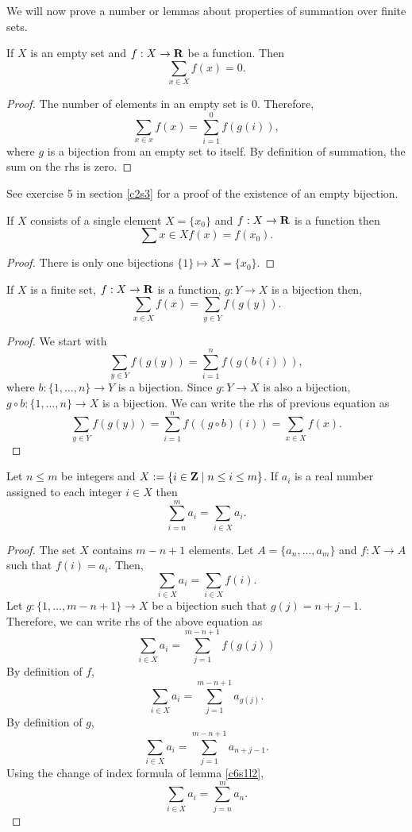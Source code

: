 We will now prove a number or lemmas about properties of summation over
finite sets.
\begin{lem}\label{c6s1l7}
If $X$ is an empty set and $f: X \rightarrow \mathbf{R}$ be a function. Then
\[
\sum_{x \in X}f(x) = 0.
\]
\end{lem}
\begin{proof}
The number of elements in an empty set is $0$. Therefore,
\[
\sum_{x \in x}f(x) = \sum_{i=1}^0f(g(i)),
\]
where $g$ is a bijection from an empty set to itself. By definition of
summation, the sum on the rhs is zero.
\end{proof}
\begin{rem}
See exercise 5 in section \ref{c2s3} for a proof of the existence of an
empty bijection.
\end{rem}

\begin{lem}\label{c6s1l8}
If $X$ consists of a single element $X = \{x_0\}$ and $f:X \rightarrow \mathbf{R}$
is a function then
\[
\sum{x \in X}f(x) = f(x_0).
\]
\end{lem}
\begin{proof}
There is only one bijections $\{1\} \mapsto X = \{x_0\}$.
\end{proof}

\begin{lem}\label{c6s1l9}
If $X$ is a finite set, $f: X \rightarrow \mathbf{R}$ is a function, $g: Y 
\rightarrow X$ is a bijection then,
\[
\sum_{x \in X}f(x) = \sum_{y \in Y}f(g(y)).
\]
\end{lem}
\begin{proof}
We start with
\[
\sum_{y \in Y}f(g(y)) = \sum_{i=1}^n f(g(b(i))),
\]
where $b: \{1, \ldots, n\} \rightarrow Y$ is a bijection. Since $g: Y
\rightarrow X$ is also a bijection, $g \circ b: \{1, \ldots, n\} \rightarrow
X$ is a bijection. We can write the rhs of previous equation as
\[
\sum_{y \in Y}f(g(y)) = \sum_{i=1}^n f((g \circ b)(i)) = \sum_{x \in X}f(x).
\]
\end{proof}

\begin{lem}\label{c6s1l10}
Let $n \le m$ be integers and $X := \{i \in \mathbf{Z} \;|\; n \le i \le m\}$. If
$a_i$ is a real number assigned to each integer $i \in X$ then
\[
\sum_{i=n}^m a_i = \sum_{i \in X}a_i.
\]
\end{lem}
\begin{proof}
The set $X$ contains $m - n + 1$ elements. Let $A = \{a_n, \ldots, a_m\}$
and $f: X \rightarrow A$ such that $f(i) = a_i$. Then,
\[
\sum_{i \in X}a_i = \sum_{i \in X}f(i).
\]
Let $g:\{1, \ldots, m - n + 1\} \rightarrow X$ be a bijection such that
$g(j) = n + j - 1$. Therefore, we can write rhs of the above equation as
\[
\sum_{i \in X}a_i = \sum_{j=1}^{m-n+1}f(g(j))
\]
By definition of $f$,
\[
\sum_{i \in X}a_i = \sum_{j=1}^{m-n+1}a_{g(j)}.
\]
By definition of $g$,
\[
\sum_{i \in X}a_i = \sum_{j=1}^{m-n+1}a_{n + j - 1}.
\]
Using the change of index formula of lemma \ref{c6s1l2},
\[
\sum_{i \in X}a_i = \sum_{j=n}^ma_n.
\]
\end{proof}

